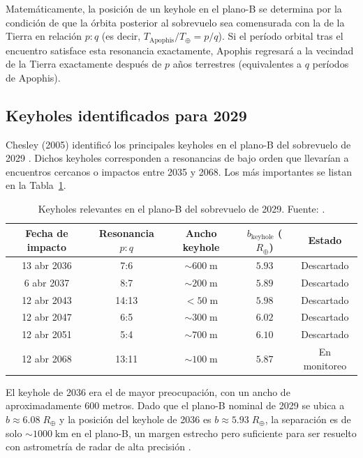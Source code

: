 \documentclass[a4paper]{article}
\begin{document}
Matemáticamente, la posición de un keyhole en el plano-B se determina por la condición de que la órbita posterior al sobrevuelo sea comensurada con la de la Tierra en relación $p\!:\!q$ (es decir, $T_\text{Apophis}/T_\oplus = p/q$). Si el período orbital tras el encuentro satisface esta resonancia exactamente, Apophis regresará a la vecindad de la Tierra exactamente después de $p$ años terrestres (equivalentes a $q$ períodos de Apophis).

\subsection{Keyholes identificados para 2029}

Chesley (2005) identificó los principales keyholes en el plano-B del sobrevuelo de 2029 \cite{chesley2005keyholes}. Dichos keyholes corresponden a resonancias de bajo orden que llevarían a encuentros cercanos o impactos entre 2035 y 2068. Los más importantes se listan en la Tabla~\ref{tab:keyholes}.

\begin{table}[H]
  \centering
  \caption{Keyholes relevantes en el plano-B del sobrevuelo de 2029. Fuente: \cite{chesley2005keyholes, farnocchia2023orbit}.}
  \label{tab:keyholes}
  \begin{tabular}{ccccc}
    \toprule
    \textbf{Fecha de impacto} & \textbf{Resonancia $p\!:\!q$} & \textbf{Ancho keyhole} & \textbf{$b_\text{keyhole}$ ($R_\oplus$)} & \textbf{Estado} \\
    \midrule
    13 abr 2036 & 7:6  & $\sim 600\;\text{m}$  & $5.93$ & Descartado \\
    6 abr  2037 & 8:7  & $\sim 200\;\text{m}$  & $5.89$ & Descartado \\
    12 abr 2043 & 14:13 & $< 50\;\text{m}$     & $5.98$ & Descartado \\
    12 abr 2047 & 6:5  & $\sim 300\;\text{m}$  & $6.02$ & Descartado \\
    12 abr 2051 & 5:4  & $\sim 700\;\text{m}$  & $6.10$ & Descartado \\
    12 abr 2068 & 13:11 & $\sim 100\;\text{m}$ & $5.87$ & En monitoreo \\
    \bottomrule
  \end{tabular}
\end{table}

El keyhole de 2036 era el de mayor preocupación, con un ancho de aproximadamente 600 metros. Dado que el plano-B nominal de 2029 se ubica a $b \approx 6.08\;R_\oplus$ y la posición del keyhole de 2036 es $b \approx 5.93\;R_\oplus$, la separación es de solo $\sim 1000\;\text{km}$ en el plano-B, un margen estrecho pero suficiente para ser resuelto con astrometría de radar de alta precisión \cite{farnocchia2013yarkovsky, brozovic2018radar}.
\end{document}

